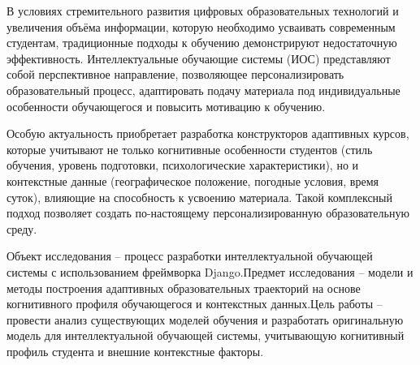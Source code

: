 
В условиях стремительного развития цифровых образовательных 
технологий и увеличения объёма информации, которую необходимо усваивать 
современным студентам, традиционные подходы к обучению демонстрируют 
недостаточную эффективность. Интеллектуальные обучающие системы (ИОС) 
представляют собой перспективное направление, позволяющее персонализировать 
образовательный процесс, адаптировать подачу материала под индивидуальные 
особенности обучающегося и повысить мотивацию к обучению.

Особую актуальность приобретает разработка конструкторов адаптивных курсов, 
которые учитывают не только когнитивные особенности студентов (стиль обучения, 
уровень подготовки, психологические характеристики), но и контекстные данные 
(географическое положение, погодные условия, время суток), влияющие на способность
к усвоению материала. Такой комплексный подход позволяет создать по-настоящему 
персонализированную образовательную среду.

Объект исследования – процесс разработки интеллектуальной обучающей системы с 
использованием фреймворка Django.Предмет исследования – модели и методы 
построения адаптивных образовательных траекторий на основе когнитивного профиля 
обучающегося и контекстных данных.Цель работы – провести анализ существующих 
моделей обучения и разработать оригинальную модель для интеллектуальной 
обучающей системы, учитывающую когнитивный профиль студента и внешние контекстные 
факторы. 